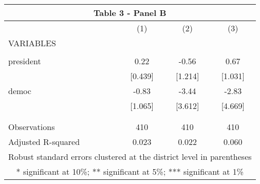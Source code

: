 \begin{tabular}{lccc}
\multicolumn{4}{c}{Table 3 - Panel B} \\ \hline
 & (1) & (2) & (3) \\
VARIABLES &  &  &  \\ \hline
 &  &  &  \\
president & 0.22 & -0.56 & 0.67 \\
 & [0.439] & [1.214] & [1.031] \\
democ & -0.83 & -3.44 & -2.83 \\
 & [1.065] & [3.612] & [4.669] \\
 &  &  &  \\
 &  &  &  \\
Observations & 410 & 410 & 410 \\
 Adjusted R-squared & 0.023 & 0.022 & 0.060 \\ \hline
\multicolumn{4}{c}{ Robust standard errors clustered at the district level in parentheses} \\
\multicolumn{4}{c}{ * significant at 10\%; ** significant at 5\%; *** significant at 1\%} \\
\end{tabular}
